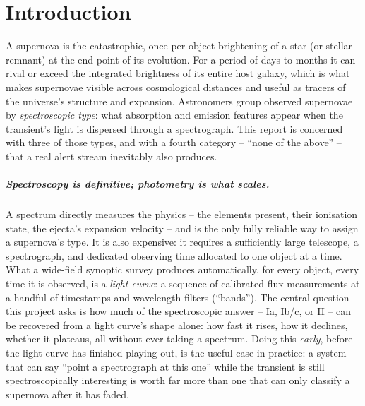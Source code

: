 \chapter{Introduction}
\label{sec:introduction}

A supernova is the catastrophic, once-per-object brightening of a star
(or stellar remnant) at the end point of its evolution. For a period of
days to months it can rival or exceed the integrated brightness of its
entire host galaxy, which is what makes supernovae visible across cosmological
distances and useful as tracers of the universe's structure and expansion.
Astronomers group observed supernovae by \emph{spectroscopic type}: what
absorption and emission features appear when the transient's light is
dispersed through a spectrograph. This report is concerned with three of
those types, and with a fourth category -- ``none of the above'' -- that a
real alert stream inevitably also produces.

\paragraph{Spectroscopy is definitive; photometry is what scales.}
A spectrum directly measures the physics -- the elements present, their
ionisation state, the ejecta's expansion velocity -- and is the only fully
reliable way to assign a supernova's type. It is also expensive: it requires
a sufficiently large telescope, a spectrograph, and dedicated observing time
allocated to one object at a time. What a wide-field synoptic survey
produces automatically, for every object, every time it is observed, is a
\emph{light curve}: a sequence of calibrated flux measurements at a handful
of timestamps and wavelength filters (``bands''). The central question this
project asks is how much of the spectroscopic answer -- Ia, Ib/c, or II --
can be recovered from a light curve's shape alone: how fast it rises, how
it declines, whether it plateaus, all without ever taking a spectrum. Doing
this \emph{early}, before the light curve has finished playing out, is the
useful case in practice: a system that can say ``point a spectrograph at
this one'' while the transient is still spectroscopically interesting is
worth far more than one that can only classify a supernova after it has
faded.

